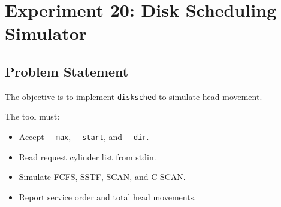 
\section{Experiment 20: Disk Scheduling Simulator}

\subsection{Problem Statement}
The objective is to implement \texttt{disksched} to simulate head movement.

The tool must:
\begin{itemize}
    \item Accept \verb|--max|, \verb|--start|, and \verb|--dir|.
    \item Read request cylinder list from stdin.
    \item Simulate FCFS, SSTF, SCAN, and C-SCAN.
    \item Report service order and total head movements.
\end{itemize}

